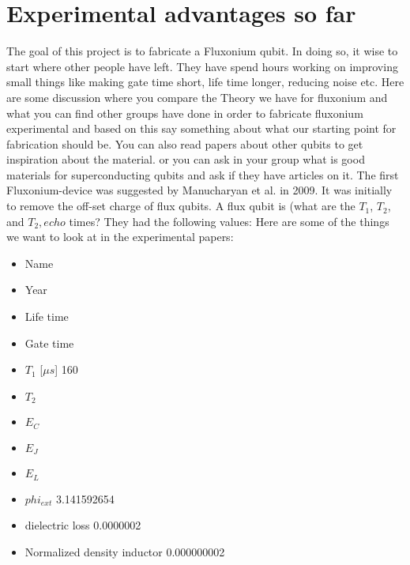 \chapter{Experimental advantages so far}
    The goal of this project is to fabricate a Fluxonium qubit. 
    In doing so, it wise to start where other people have left. They have spend hours working on improving small things like making gate time short, life time longer, reducing noise etc. 
    \newline
    \newline
    Here are some discussion where you compare the Theory we have for fluxonium and what you can find other groups have done in order to fabricate fluxonium experimental and based on this say something about what our starting point for fabrication should be. You can also read papers about other qubits to get inspiration about the material. or you can ask in your group what is good materials for superconducting qubits and ask if they have articles on it. 
    \newline
    \newline 
    The first Fluxonium-device was suggested by Manucharyan et al. in 2009. It was initially to remove the off-set charge of flux qubits. A flux qubit is (what are the $T_1$, $T_2$, and $T_2,echo$ times? They had the following values:
    Here are some of the things we want to look at in the experimental papers: 
        \begin{itemize}
            \item Name	
            \item Year	
            \item Life time	
            \item Gate time	
            \item $T_1$ [$\mu s$]	160
            \item $T_2$	
            \item $E_C$	
            \item $E_J$	
            \item $E_L$ 	
            \item $phi_{ext}$	3.141592654
            \item dielectric loss	0.0000002
            \item Normalized density inductor	0.000000002
        \end{itemize}
    
